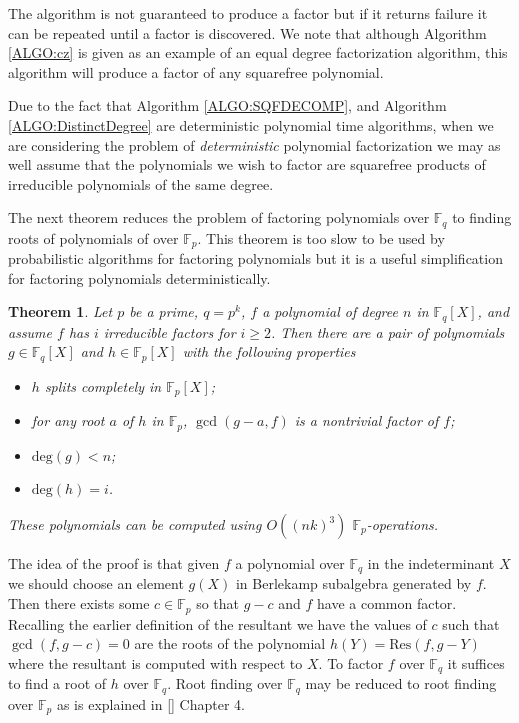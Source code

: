 \documentclass{article}
\newcounter{dummy} \numberwithin{dummy}{section}
\theoremstyle{plain}
\newtheorem{thm}[dummy]{Theorem}
\theoremstyle{definition}
\def\Fp {{ \mathbb{F} _ {p} }}
\def\Fq {{ \mathbb{F} _ {q} }}
\def\deg {{ \mathrm{deg}}}
\def\Res {{ \mathrm{Res}}}
\begin{document}
		The algorithm is not guaranteed to produce a factor but if it returns failure it can be repeated until a factor is discovered. We note that although Algorithm \ref{ALGO:cz} is given as an example of an equal degree factorization algorithm, this algorithm will produce a factor of any squarefree polynomial.
		
		Due to the fact that Algorithm \ref{ALGO:SQFDECOMP}, and Algorithm \ref{ALGO:DistinctDegree} are deterministic polynomial time algorithms, when we are considering the problem of \emph{deterministic} polynomial factorization we may as well assume that the polynomials we wish to factor are squarefree products of irreducible polynomials of the same degree.  
		
		The next theorem reduces the problem of factoring polynomials over $\Fq$ to finding roots of polynomials of over $\Fp$. This theorem is too slow to be used by probabilistic algorithms for factoring polynomials but it is a useful simplification for factoring polynomials deterministically. 

		\begin{thm} 
				\label{THM:rootFinding}
				Let $p$ be a prime, $q=p^k$, $f$ a polynomial of degree $n$ in $\Fq[X]$, and assume $f$ has $i$ irreducible factors for $i \geq 2$. Then there are a pair of polynomials $g\in \Fq[X]$ and $h \in \Fp[X]$ with the following properties 
				\begin{itemize}
				    \item $h$ splits completely in $\Fp[X]$;
				    \item for any root $a$ of $h$ in $\Fp$, $\gcd(g - a, f)$ is a nontrivial factor of $f$; 
				    \item $\deg(g) < n$;
				    \item $\deg(h) = i$.
				\end{itemize}
				These polynomials can be computed using $O((nk)^3)$ $\Fp$-operations. 
		\end{thm}
		
		The idea of the proof is that given $f$ a polynomial over $\Fq$ in the indeterminant $X$ we should choose an element $g(X)$ in Berlekamp subalgebra generated by $f$. Then there exists some $c \in \Fp$ so that $g-c$ and $f$ have a common factor. Recalling the earlier definition of the resultant we have the values of $c$ such that $\gcd(f,g-c)=0$ are the roots of the polynomial $h(Y)=\Res(f,g-Y)$ where the resultant is computed with respect to $X$. To factor $f$ over $\Fq$ it suffices to find a root of $h$ over $\Fq$. Root finding over $\Fq$ may be reduced to root finding over $\Fp$ as is explained in [] Chapter 4.
		
\end{document}
